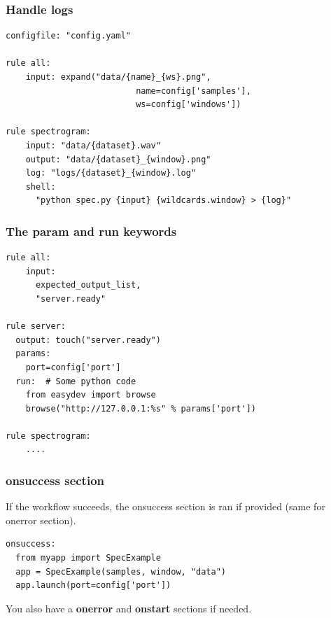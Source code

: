 \documentclass{beamer}
\begin{document}


\begin{frame}[fragile]
 \frametitle{Handle logs}    
    \begin{block}{}
    \begin{lstlisting}[basicstyle=\small]
configfile: "config.yaml"

rule all:
    input: expand("data/{name}_{ws}.png", 
                          name=config['samples'], 
                          ws=config['windows'])

rule spectrogram:
    input: "data/{dataset}.wav"
    output: "data/{dataset}_{window}.png"
    log: "logs/{dataset}_{window}.log"
    shell: 
      "python spec.py {input} {wildcards.window} > {log}"
    \end{lstlisting}
    \end{block} 
\end{frame}


\begin{frame}[fragile]
 \frametitle{The \textbf{param} and \textbf{run} keywords}
   \begin{block}{}
    \begin{lstlisting}[basicstyle=\small]
rule all:
    input: 
      expected_output_list,
      "server.ready"

rule server:
  output: touch("server.ready")
  params: 
    port=config['port']
  run:  # Some python code
    from easydev import browse
    browse("http://127.0.0.1:%s" % params['port'])

rule spectrogram:
    ....
    \end{lstlisting}
    \end{block} 
\end{frame}


\begin{frame}[fragile]
    \frametitle{onsuccess section}    
    If the workflow succeeds, the onsuccess section is ran if provided
    (same for onerror section).

    \begin{block}{}
    \begin{lstlisting}[basicstyle=\large]
onsuccess:
  from myapp import SpecExample
  app = SpecExample(samples, window, "data")
  app.launch(port=config['port'])
    \end{lstlisting}
    \end{block}
    
    You also have a \textbf{onerror} and \textbf{onstart} sections if needed.
\end{frame}
\end{document}
